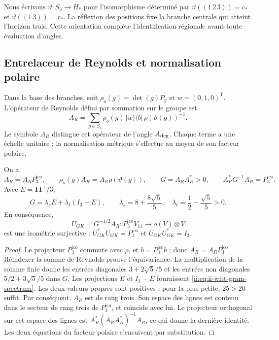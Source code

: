 Nous écrivons \(\vartheta:S_3\to H_*\) pour l’isomorphisme déterminé
par \(\vartheta((1\,2\,3))=c_*\) et
\(\vartheta((1\,3))=r_*\). La réflexion des positions fixe la branche
centrale qui atteint l’horizon trois. Cette orientation complète
l’identification régionale avant toute évaluation d’angles.

\subsection{Entrelaceur de Reynolds et normalisation polaire}

Dans la base des branches, soit \(\rho_o(g)=\det(g)P_g\) et
\(w=(0,1,0)^{\mathsf T}\). L’opérateur de Reynolds défini par sommation
sur le groupe est
\begin{equation}
 A_R=\sum_{g\in S_3}\rho_o(g)\,|w\rangle\langle b|\,
                       \rho(\vartheta(g))^{-1}.
 \label{ii:eq:ii-witt-reynolds}
\end{equation}
Le symbole \(A_R\) distingue cet opérateur de l’angle
\(A_{\rm deg}\). Chaque terme a une échelle unitaire ; la normalisation
métrique s’effectue au moyen de son facteur polaire.

\begin{proposition}
\label{ii:prop:ii-witt-polar}
On a
\[
 A_R=A_RP_3^{\mathrm{ico}},\qquad
 \rho_o(g)A_R=A_R\rho(\vartheta(g)),\qquad
 G=A_RA_R^*>0,\qquad A_R^*G^{-1}A_R=P_3^{\mathrm{ico}}.
\]
Avec \(E=\mathbf1\mathbf1^{\mathsf T}/3\),
\begin{equation}
 G=\lambda_sE+\lambda_t(I_3-E),\qquad
 \lambda_s=8+\frac{8\sqrt5}{5},\quad
 \lambda_t=\frac12-\frac{\sqrt5}{5}>0.
 \label{ii:eq:ii-witt-gram-spectrum}
\end{equation}
En conséquence,
\[
 U_{GK}=G^{-1/2}A_R:P_3^{\mathrm{ico}}V_{11}\longrightarrow o(V)\otimes V
\]
est une isométrie surjective :
\(U_{GK}^*U_{GK}=P_3^{\mathrm{ico}}\) et \(U_{GK}U_{GK}^*=I_3\).
\end{proposition}
\begin{proof}
Le projecteur \(P_3^{\mathrm{ico}}\) commute avec \(\rho\), et \(b=P_3^{\mathrm{ico}}b\) ;
donc \(A_R=A_RP_3^{\mathrm{ico}}\). Réindexer la somme de Reynolds prouve
l’équivariance. La multiplication de la somme finie donne les entrées diagonales
\(3+2\sqrt5/5\) et les entrées non diagonales
\(5/2+3\sqrt5/5\) dans \(G\). Les projections \(E\) et \(I_3-E\)
fournissent \eqref{ii:eq:ii-witt-gram-spectrum}. Les deux valeurs propres sont
positives ; pour la plus petite, \(25>20\) suffit. Par conséquent, \(A_R\) est de
rang trois. Son espace des lignes est contenu dans le secteur de rang trois
de \(P_3^{\mathrm{ico}}\), et coïncide avec lui. Le projecteur orthogonal sur cet espace
des lignes est \(A_R^*(A_RA_R^*)^{-1}A_R\), ce qui donne la dernière identité.
Les deux équations du facteur polaire s’ensuivent par substitution.
\end{proof}

